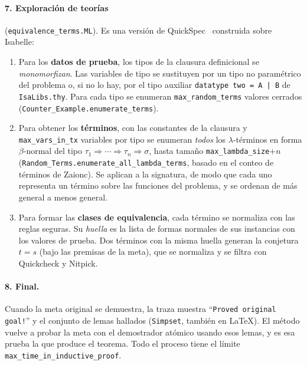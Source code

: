 \documentclass[11pt,a4paper]{article}
\newcommand{\isa}[1]{\texttt{#1}}
\theoremstyle{definition}
\theoremstyle{remark}
\begin{document}
\paragraph{7. Exploración de teorías} (\isa{equivalence\_terms.ML}).
Es una versión de QuickSpec~\cite{quickspec} construida sobre Isabelle:
\begin{enumerate}[nosep]
  \item Para los \textbf{datos de prueba}, los tipos de la clausura definicional se
        \emph{monomorfizan}. Las variables de tipo se sustituyen por un tipo no
        paramétrico del problema o, si no lo hay, por el tipo auxiliar
        \isa{datatype two = A | B} de \isa{IsaLibs.thy}. Para cada tipo se enumeran
        \isa{max\_random\_terms} valores cerrados
        (\isa{Counter\_Example.enumerate\_terms}).
  \item Para obtener los \textbf{términos}, con las constantes de la clausura y
        \isa{max\_vars\_in\_tx} variables por tipo se enumeran \emph{todos} los $\lambda$-términos en forma
        $\beta$-normal del tipo $\tau_1 \Rightarrow \cdots \Rightarrow \tau_n
        \Rightarrow \sigma$, hasta tamaño \isa{max\_lambda\_size}$+n$
        (\isa{Random\_Terms.enumerate\_all\_lambda\_terms}, basado en el conteo de
        términos de Zaionc). Se aplican a la signatura, de modo que cada uno
        representa un término sobre las funciones del problema, y se ordenan de más
        general a menos general.
  \item Para formar las \textbf{clases de equivalencia}, cada término se normaliza
        con las reglas seguras. Su \emph{huella} es la lista de formas normales de sus instancias
        con los valores de prueba. Dos términos con la misma huella generan la
        conjetura $t = s$ (bajo las premisas de la meta), que se normaliza y se
        filtra con Quickcheck y Nitpick.
\end{enumerate}

\paragraph{8. Final.}
Cuando la meta original se demuestra, la traza muestra
``\isa{Proved original goal!}'' y el conjunto de lemas hallados (\isa{Simpset}, también
en \LaTeX). El método vuelve a probar la meta con el demostrador atómico usando esos
lemas, y es esa prueba la que produce el teorema. Todo el proceso tiene el límite
\isa{max\_time\_in\_inductive\_proof}.
\end{document}
